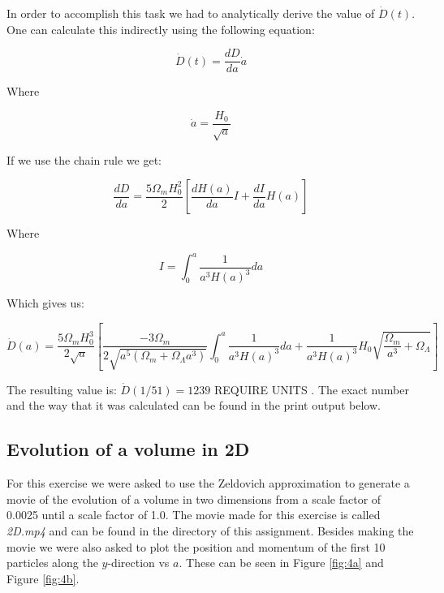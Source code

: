 \documentclass[a4paper,10pt]{article}
\begin{document}
In order to accomplish this task we had to analytically derive the value of $\dot{D}(t)$. One can calculate this indirectly using the following equation: 

\begin{equation}
\dot{D}(t) = \frac{dD}{da}\dot{a}
\end{equation} 

Where

\begin{equation}
\dot{a} = \frac{H_0}{\sqrt{a}}
\end{equation}


If we use the chain rule we get:

\begin{equation}
\frac{dD}{da} = \frac{5\Omega_mH_0^2}{2}[\frac{dH(a)}{da}I+\frac{dI}{da}H(a)]
\end{equation}

Where

\begin{equation}
I = \int^a_0\frac{1}{a^3H(a)^3}da
\end{equation}


Which gives us: 

\begin{equation}
\dot{D}(a) = \frac{5\Omega_mH_0^3}{2\sqrt{a}}[\frac{-3\Omega_m}{2\sqrt{a^5(\Omega_m+\Omega_\Lambda a^3)}}\int^a_0\frac{1}{a^3H(a)^3}da+\frac{1}{a^3H(a)^3}H_0\sqrt{\frac{\Omega_m}{a^3}+\Omega_\Lambda}]
\end{equation}

The resulting value is: $\dot{D}(1/51) = 1239$ REQUIRE UNITS . The exact number and the way that it was calculated can be found in the print output below. 

\subsection{Evolution of a volume in 2D}

For this exercise we were asked to use the Zeldovich approximation to generate a movie of the evolution of a volume in two dimensions from a scale factor of 0.0025 until a scale factor of 1.0. The movie made for this exercise is called \textit{2D.mp4} and can be found in the directory of this assignment. Besides making the movie we were also asked to plot the position and momentum of the first 10 particles along the $y$-direction vs $a$. These can be seen in Figure \ref{fig:4a} and Figure \ref{fig:4b}. 
\end{document}
